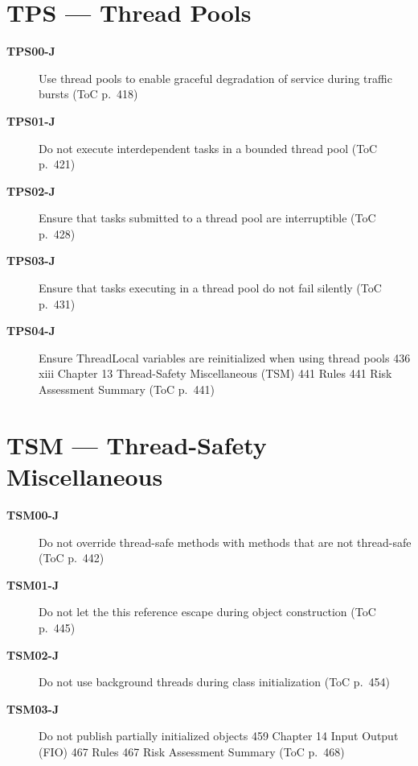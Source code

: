 \documentclass[11pt]{report}
\begin{document}
\chapter{TPS — Thread Pools}
\begin{description}
\item[\textbf{TPS00-J}] Use thread pools to enable graceful degradation of service during traffic bursts (ToC p.~418)
\item[\textbf{TPS01-J}] Do not execute interdependent tasks in a bounded thread pool (ToC p.~421)
\item[\textbf{TPS02-J}] Ensure that tasks submitted to a thread pool are interruptible (ToC p.~428)
\item[\textbf{TPS03-J}] Ensure that tasks executing in a thread pool do not fail silently (ToC p.~431)
\item[\textbf{TPS04-J}] Ensure ThreadLocal variables are reinitialized when using thread pools 436 xiii Chapter 13 Thread-Safety Miscellaneous (TSM) 441 Rules 441 Risk Assessment Summary (ToC p.~441)
\end{description}
\clearpage
\chapter{TSM — Thread-Safety Miscellaneous}
\begin{description}
\item[\textbf{TSM00-J}] Do not override thread-safe methods with methods that are not thread-safe (ToC p.~442)
\item[\textbf{TSM01-J}] Do not let the this reference escape during object construction (ToC p.~445)
\item[\textbf{TSM02-J}] Do not use background threads during class initialization (ToC p.~454)
\item[\textbf{TSM03-J}] Do not publish partially initialized objects 459 Chapter 14 Input Output (FIO) 467 Rules 467 Risk Assessment Summary (ToC p.~468)
\end{description}
\clearpage
\end{document}
